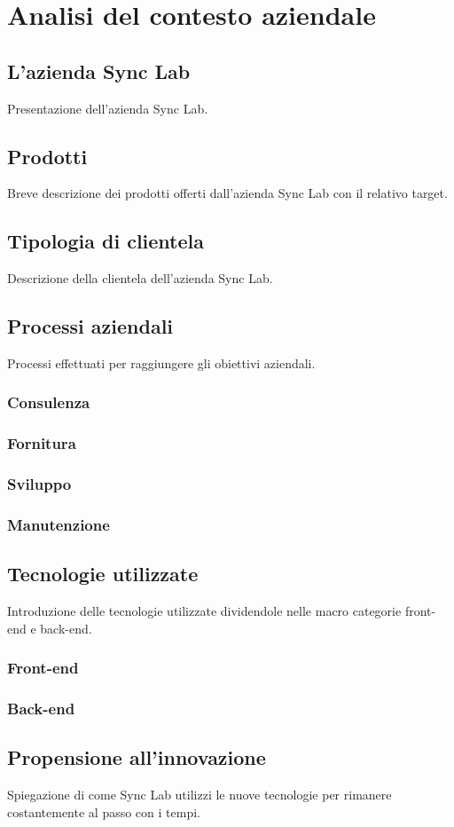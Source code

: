 
\chapter{Analisi del contesto aziendale}
\label{cap:contesto-aziendale}

\section{L'azienda Sync Lab}
Presentazione dell'azienda Sync Lab.

\section{Prodotti}
Breve descrizione dei prodotti offerti dall'azienda Sync Lab con il relativo target.

\section{Tipologia di clientela}
Descrizione della clientela dell'azienda Sync Lab.

\section{Processi aziendali}
Processi effettuati per raggiungere gli obiettivi aziendali.

\subsection{Consulenza}

\subsection{Fornitura}

\subsection{Sviluppo}

\subsection{Manutenzione}

\section{Tecnologie utilizzate}
Introduzione delle tecnologie utilizzate dividendole nelle macro categorie front-end e back-end.

\subsection{Front-end}

\subsection{Back-end}

\section{Propensione all'innovazione}
Spiegazione di come Sync Lab utilizzi le nuove tecnologie per rimanere costantemente al passo con i tempi.
